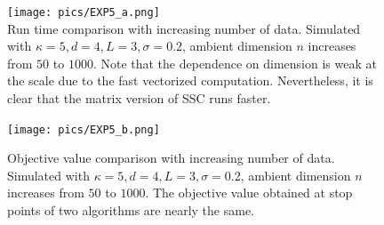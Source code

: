\documentclass[twoside,11pt]{article}
\numberwithin{equation}{section}
\begin{document}
\begin{figure}[htb]
\begin{minipage}[t]{0.48\linewidth}
  \centering
  \texttt{[image: pics/EXP5\_a.png]}\\
  \caption{Run time comparison with increasing number of data. Simulated with $\kappa=5, d=4, L=3, \sigma=0.2$, ambient dimension $n$ increases from $50$ to $1000$. Note that the dependence on dimension is weak at the scale due to the fast vectorized computation. Nevertheless, it is clear that the matrix version of SSC runs faster.}\label{fig.runtime_dim}
\end{minipage}
\hspace{0.02\linewidth}
\begin{minipage}[t]{0.48\linewidth}
  \centering
  \texttt{[image: pics/EXP5\_b.png]}\\
  \caption{Objective value comparison with increasing number of data. Simulated with $\kappa=5, d=4, L=3, \sigma=0.2$, ambient dimension $n$ increases from $50$ to $1000$. The objective value obtained at stop points of two algorithms are nearly the same.}\label{fig.obj_dim}
\end{minipage}
\end{figure}
\end{document}
